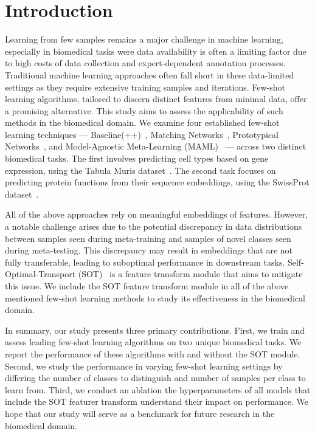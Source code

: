 \section{Introduction}

Learning from few samples remains a major challenge in machine learning, especially in biomedical tasks were data availability is often a limiting factor due to high costs of data collection and expert-dependent annotation processes. Traditional machine learning approaches often fall short in these data-limited settings as they require extensive training samples and iterations. 
Few-shot learning algorithms, tailored to discern distinct features from minimal data, offer a promising alternative. 
This study aims to assess the applicability of such methods in the biomedical domain. We examine four established few-shot learning techniques — Baseline(++)~\cite{baseline}, 
Matching Networks~\cite{matchingnet}, Prototypical Networks~\cite{protonet}, and Model-Agnostic Meta-Learning (MAML)~\cite{maml} — across two distinct biomedical tasks. 
The first involves predicting cell types based on gene expression, using the Tabula Muris dataset~\cite{tabula2018}. The second task focuses on predicting protein functions 
from their sequence embeddings, using the SwissProt dataset~\cite{uniprot2019}.

All of the above approaches rely on meaningful embeddings of features. However, a notable challenge arises due to the potential discrepancy in data 
distributions between samples seen during meta-training and samples of novel classes seen during meta-testing. This discrepancy may result in embeddings that are 
not fully transferable, leading to suboptimal performance in downstream tasks. Self-Optimal-Transport (SOT)~\cite{sot} is a feature transform module that aims to mitigate this issue. We include the SOT feature transform module in all of the above mentioned few-shot learning methods to 
study its effectiveness in the biomedical domain.

In summary, our study presents three primary contributions. First, we train and assess leading few-shot learning algorithms on two unique biomedical tasks. We report the performance of these algorithms with and without the SOT module. 
Second, we study the performance in varying few-shot learning settings by differing the number of classes to distinguish and number of samples per class to learn from.
Third, we conduct an ablation the hyperparameters of all models that include the SOT featurer transform understand their impact on performance. We hope that our study will serve as a benchmark for future research in the biomedical domain.


